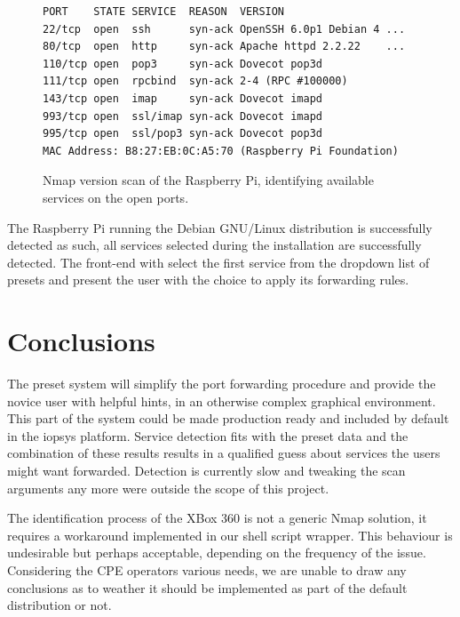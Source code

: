 \documentclass[a4paper,11pt,makeidx]{kth-bcs}
\begin{document}
   \begin{figure}[t]
      \centering
      \label{fig:rasp_scan}
      \begin{lstlisting}[escapechar=!]
PORT    STATE SERVICE  REASON  VERSION
22/tcp  open  ssh      syn-ack OpenSSH 6.0p1 Debian 4 ...
80/tcp  open  http     syn-ack Apache httpd 2.2.22    ...
110/tcp open  pop3     syn-ack Dovecot pop3d
111/tcp open  rpcbind  syn-ack 2-4 (RPC #100000)
143/tcp open  imap     syn-ack Dovecot imapd
993/tcp open  ssl/imap syn-ack Dovecot imapd
995/tcp open  ssl/pop3 syn-ack Dovecot pop3d
MAC Address: B8:27:EB:0C:A5:70 (Raspberry Pi Foundation)
\end{lstlisting}
      \caption{
         \small{
Nmap version scan of the Raspberry Pi, identifying available services on the open ports.
         }
      }
   \end{figure}
The Raspberry Pi running the Debian GNU/Linux distribution is successfully detected as such, all services selected during the installation are successfully detected.
The front-end with select the first service from the dropdown list of presets and present the user with the choice to apply its forwarding rules.

\chapter{Conclusions}

The preset system will simplify the port forwarding procedure and provide the novice user with helpful hints, in an otherwise complex graphical environment.
This part of the system could be made production ready and included by default in the iopsys platform.
Service detection fits with the preset data and the combination of these results results in a qualified guess about services the users might want forwarded.
Detection is currently slow and tweaking the scan arguments any more were outside the scope of this project.

The identification process of the XBox 360 is not a generic Nmap solution, it requires a workaround implemented in our shell script wrapper.
This behaviour is undesirable but perhaps acceptable, depending on the frequency of the issue.
Considering the CPE operators various needs, we are unable to draw any conclusions as to weather it should be implemented as part of the default distribution or not.
\end{document}
